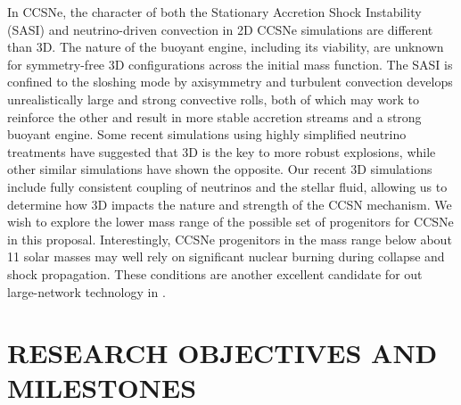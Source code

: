 \documentclass[11pt,letterpaper,english]{article}
\begin{document}
In CCSNe, the character of both the Stationary Accretion Shock
Instability (SASI) and neutrino-driven convection in 2D CCSNe
simulations are different than 3D. The nature of the buoyant engine,
including its viability, are unknown for symmetry-free 3D
configurations across the initial mass function. The SASI is confined
to the sloshing mode by axisymmetry and turbulent convection develops
unrealistically large and strong convective rolls, both of which may
work to reinforce the other and result in more stable accretion
streams and a strong buoyant engine.  Some recent simulations using
highly simplified neutrino treatments have suggested that 3D
is the key to more robust explosions, while other similar
simulations have shown the opposite. Our recent 3D simulations
\citep{lentzetal2015} include fully consistent coupling of neutrinos
and the stellar fluid, allowing us to determine how 3D impacts the
nature and strength of the CCSN mechanism. We wish to explore the
lower mass range of the possible set of progenitors for CCSNe in this
proposal. Interestingly, CCSNe progenitors in the mass range below
about 11 solar masses may well rely on significant nuclear burning
during collapse and shock propagation. These conditions are another
excellent candidate for out large-network technology in \chimera.



\section{RESEARCH OBJECTIVES AND MILESTONES }  










\end{document}
